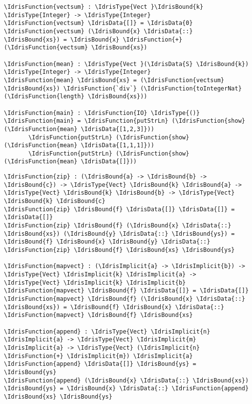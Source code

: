 \documentclass[xetex,xcolor={usenames,dvipsnames},mathserif,serif,17pt]{beamer}
\newcommand{\IdrisData}[1]{\textcolor{red}{#1}}
\newcommand{\IdrisType}[1]{\textcolor{blue}{#1}}
\newcommand{\IdrisBound}[1]{\textcolor{violet}{#1}}
\newcommand{\IdrisFunction}[1]{\textcolor{OliveGreen}{#1}}
\newcommand{\IdrisImplicit}[1]{{\itshape \IdrisBound{#1}}}
\begin{document}
\begin{frame}[fragile]
  \begin{Verbatim}[commandchars=\\\{\}]
\IdrisFunction{vectsum} : \IdrisType{Vect }\IdrisBound{k} \IdrisType{Integer} -> \IdrisType{Integer}
\IdrisFunction{vectsum} \IdrisData{[]} = \IdrisData{0}
\IdrisFunction{vectsum} (\IdrisBound{x} \IdrisData{::} \IdrisBound{xs}) = \IdrisBound{x} \IdrisFunction{+} (\IdrisFunction{vectsum} \IdrisBound{xs})

\IdrisFunction{mean} : \IdrisType{Vect }(\IdrisData{S} \IdrisBound{k}) \IdrisType{Integer} -> \IdrisType{Integer}
\IdrisFunction{mean} \IdrisBound{xs} = (\IdrisFunction{vectsum} \IdrisBound{xs}) \IdrisFunction{`div`} (\IdrisFunction{toIntegerNat} (\IdrisFunction{length} \IdrisBound{xs}))

\IdrisFunction{main} : \IdrisFunction{IO} \IdrisType{()}
\IdrisFunction{main} = \IdrisFunction{putStrLn} (\IdrisFunction{show} (\IdrisFunction{mean} \IdrisData{[1,2,3]}))
       \IdrisFunction{putStrLn} (\IdrisFunction{show} (\IdrisFunction{mean} \IdrisData{[1,1,1]}))
       \IdrisFunction{putStrLn} (\IdrisFunction{show} (\IdrisFunction{mean} \IdrisData{[]}))
  \end{Verbatim}
\end{frame}

\begin{frame}[fragile]
\begin{Verbatim}[commandchars=\\\{\}]
\IdrisFunction{zip} : (\IdrisBound{a} -> \IdrisBound{b} -> \IdrisBound{c}) -> \IdrisType{Vect} \IdrisBound{k} \IdrisBound{a} -> \IdrisType{Vect} \IdrisBound{k} \IdrisBound{b} -> \IdrisType{Vect} \IdrisBound{k} \IdrisBound{c}
\IdrisFunction{zip} \IdrisBound{f} \IdrisData{[]} \IdrisData{[]} = \IdrisData{[]}
\IdrisFunction{zip} \IdrisBound{f} (\IdrisBound{x} \IdrisData{::} \IdrisBound{xs}) (\IdrisBound{y} \IdrisData{::} \IdrisBound{ys}) = \IdrisBound{f} \IdrisBound{x} \IdrisBound{y} \IdrisData{::} \IdrisFunction{zip} \IdrisBound{f} \IdrisBound{xs} \IdrisBound{ys}

\IdrisFunction{mapvect} : (\IdrisImplicit{a} -> \IdrisImplicit{b}) -> \IdrisType{Vect} \IdrisImplicit{k} \IdrisImplicit{a} -> \IdrisType{Vect} \IdrisImplicit{k} \IdrisImplicit{b}
\IdrisFunction{mapvect} \IdrisBound{f} \IdrisData{[]} = \IdrisData{[]}
\IdrisFunction{mapvect} \IdrisBound{f} (\IdrisBound{x} \IdrisData{::} \IdrisBound{xs}) = \IdrisBound{f} \IdrisBound{x} \IdrisData{::} \IdrisFunction{mapvect} \IdrisBound{f} \IdrisBound{xs}

\IdrisFunction{append} : \IdrisType{Vect} \IdrisImplicit{n} \IdrisImplicit{a} -> \IdrisType{Vect} \IdrisImplicit{m} \IdrisImplicit{a} -> \IdrisType{Vect} (\IdrisImplicit{n} \IdrisFunction{+} \IdrisImplicit{m}) \IdrisImplicit{a}
\IdrisFunction{append} \IdrisData{[]} \IdrisBound{ys} = \IdrisBound{ys}
\IdrisFunction{append} (\IdrisBound{x} \IdrisData{::} \IdrisBound{xs}) \IdrisBound{ys} = \IdrisBound{x} \IdrisData{::} \IdrisFunction{append} \IdrisBound{xs} \IdrisBound{ys}
\end{Verbatim}
\end{frame}
\end{document}
